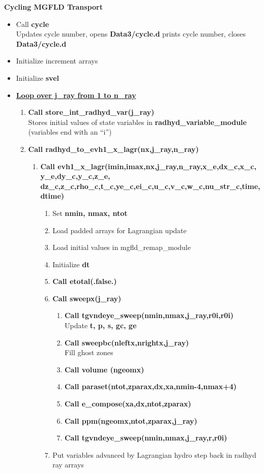 \documentclass[11pt,doublespace]{article}
\begin{document}
{\bf Cycling MGFLD Transport}
 \begin{itemize}
  \item Call {\bf cycle}\\
  Updates cycle number, opens {\bf Data3/cycle.d} prints cycle number, closes {\bf Data3/cycle.d}
  \item Initialize increment arrays
  \item Initialize {\bf svel}
  \item {\bf {\underline{Loop over j\_ray from 1 to n\_ray}}}
 \begin{enumerate}
 \item {\bf Call store\_int\_radhyd\_var(j\_ray)}\\
  Stores initial values of state variables in {\bf radhyd\_variable\_module} (variables end with an ``i'')
  \item {\bf Call radhyd\_to\_evh1\_x\_lagr(nx,j\_ray,n\_ray)}
\begin{enumerate}
  \item {\bf Call evh1\_x\_lagr(imin,imax,nx,j\_ray,n\_ray,x\_e,dx\_c,x\_c,
y\_e,dy\_c,y\_c,z\_e,\\
  dz\_c,z\_c,rho\_c,t\_c,ye\_c,ei\_c,u\_c,v\_c,w\_c,nu\_str\_c,time,dtime)}
\begin{enumerate}
  \item Set {\bf nmin, nmax, ntot}
  \item Load padded arrays for Lagrangian update
  \item Load initial values in mgfld\_remap\_module
  \item Initialize {\bf dt}
  \item {\bf Call etotal(.false.)}
  \item {\bf Call sweepx(j\_ray)}
\begin{enumerate}
  \item {\bf Call tgvndeye\_sweep(nmin,nmax,j\_ray,r0i,r0i)}\\
  Update {\bf t, p, s, gc, ge}
  \item {\bf Call sweepbc(nleftx,nrightx,j\_ray)}\\
  Fill ghost zones
  \item {\bf Call volume (ngeomx)}
  \item {\bf Call paraset(ntot,zparax,dx,xa,nmin-4,nmax+4)}
  \item {\bf Call e\_compose(xa,dx,ntot,zparax)}
  \item {\bf Call ppm(ngeomx,ntot,zparax,j\_ray)}
  \item {\bf Call tgvndeye\_sweep(nmin,nmax,j\_ray,r,r0i)}
\end{enumerate}
  \item Put variables advanced by Lagrangian hydro step back in radhyd ray arrays
\end{enumerate}
\end{enumerate}
\end{enumerate}
\end{itemize}
\end{document}
